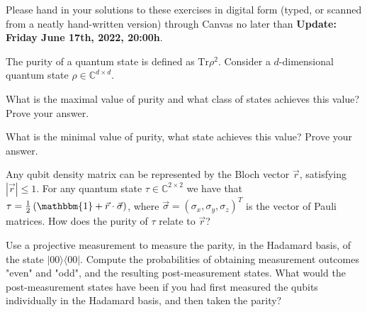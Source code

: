 \documentclass[a4paper,10pt,landscape,twocolumn]{scrartcl}
\newcommand{\proj}[1]{| #1 \rangle \langle #1 |}
\newcommand{\Tr}{\text{Tr}}
\newcommand\deadline{Update: Friday June 17th, 2022, 20:00h}
\begin{document}
\homeworkproblems

{\sffamily\noindent
Please hand in your solutions to these exercises in digital form (typed, or scanned from a neatly hand-written version) through Canvas no later than \textbf{\deadline}.  %
}


\begin{exercise}[Purity]
The purity of a quantum state is defined as $\Tr\rho^2$. Consider a $d$-dimensional quantum state $\rho\in \mathbb{C}^{d\times d}$.
\begin{subex}
What is the maximal value of purity and what class of states achieves this value? Prove your answer.
\end{subex}
\begin{subex}
What is the minimal value of purity, what state achieves this value? Prove your answer.
\end{subex}

\begin{subex}
Any qubit density matrix can be represented by the Bloch vector $\vec{r}$, satisfying $|\vec{r}|\leq 1$. For any quantum state $\tau\in \mathbb{C}^{2\times 2}$ we have that $\tau= \frac{1}{2}\left( \mathbbm{1} + \vec{r}\cdot \vec{\sigma} \right)$, where $\vec{\sigma}=(\sigma_x,\sigma_y,\sigma_z)^T$ is the vector of Pauli matrices. How does the purity of $\tau$ relate to $\vec{r}$?
\end{subex}

\end{exercise}



\begin{exercise}
Use a projective measurement to measure the parity, in the Hadamard basis, of
the state $\proj{00}$. Compute the probabilities of obtaining measurement outcomes "even" and
"odd", and the resulting post-measurement states. What would the post-measurement states have
been if you had first measured the qubits individually in the Hadamard basis, and then taken the
parity?
\end{exercise}
\end{document}
